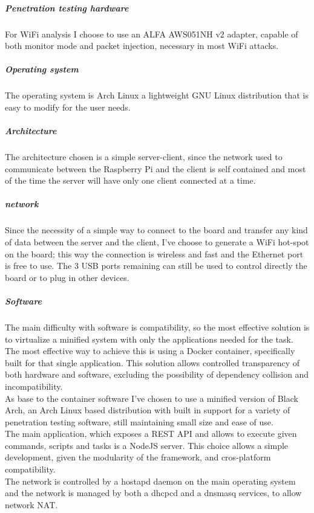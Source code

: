 \documentclass[../PiTest.tex]{subfiles}
\begin{document}
        \subparagraph{Penetration testing hardware}
            For WiFi analysis I choose to use an ALFA AWS051NH v2 adapter, capable of both monitor mode and packet injection, necessary in most WiFi attacks.

        \subparagraph{Operating system}
            The operating system is Arch Linux a lightweight GNU Linux distribution that is easy to modify for the user needs.

        \subparagraph{Architecture}
            The architecture chosen is a simple server-client, since the network used to communicate between the Raspberry Pi and the client is self contained and most of the time the server will have only one client connected at a time.

        \subparagraph{network}
            Since the necessity of a simple way to connect to the board and transfer any kind of data between the server and the client, I've choose to generate a WiFi hot-spot on the board; this way the connection is wireless and fast and the Ethernet port is free to use. The 3 USB ports remaining can still be used to control directly the board or to plug in other devices.

        \subparagraph{Software}
            The main difficulty with software is compatibility, so the most effective solution is to virtualize a minified system with only the applications needed for the task. The most effective way to achieve this is using a Docker container, specifically built for that single application. This solution allows controlled transparency of both hardware and software, excluding the possibility of dependency collision and incompatibility.\\
            As base to the container software I've chosen to use a minified version of Black Arch, an Arch Linux based distribution with built in support for a variety of penetration testing software, still maintaining small size and ease of use. \\
            The main application, which exposes a REST API and allows to execute given commands, scripts and tasks is a NodeJS server. This choice allows a simple development, given the modularity of the framework, and cros-platform compatibility.\\
            The network is controlled by a hostapd daemon on the main operating system and the network is managed by both a dhcpcd and a dnsmasq services, to allow network NAT.


			
\end{document}

